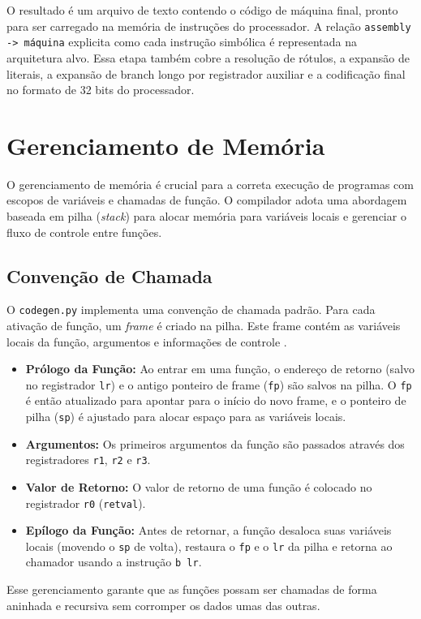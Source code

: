 \documentclass[
	12pt,				%
	oneside,
	a4paper,			%
	english,			%
	french,				%
	spanish,			%
	brazil,				%
	]{abntex2}
\begin{document}
O resultado é um arquivo de texto contendo o código de máquina final, pronto para ser carregado na memória de instruções do processador. A relação \texttt{assembly -> máquina} explicita como cada instrução simbólica é representada na arquitetura alvo. Essa etapa também cobre a resolução de rótulos, a expansão de literais, a expansão de branch longo por registrador auxiliar e a codificação final no formato de 32 bits do processador.

\section{Gerenciamento de Memória}

O gerenciamento de memória é crucial para a correta execução de programas com escopos de variáveis e chamadas de função. O compilador adota uma abordagem baseada em pilha (\emph{stack}) para alocar memória para variáveis locais e gerenciar o fluxo de controle entre funções.

\subsection{Convenção de Chamada}
O \texttt{codegen.py} implementa uma convenção de chamada padrão. Para cada ativação de função, um \emph{frame} é criado na pilha. Este frame contém as variáveis locais da função, argumentos e informações de controle \cite{compOrgDes,patterson2017}.
\begin{itemize}
    \item \textbf{Prólogo da Função:} Ao entrar em uma função, o endereço de retorno (salvo no registrador \texttt{lr}) e o antigo ponteiro de frame (\texttt{fp}) são salvos na pilha. O \texttt{fp} é então atualizado para apontar para o início do novo frame, e o ponteiro de pilha (\texttt{sp}) é ajustado para alocar espaço para as variáveis locais.
    \item \textbf{Argumentos:} Os primeiros argumentos da função são passados através dos registradores \texttt{r1}, \texttt{r2} e \texttt{r3}.
    \item \textbf{Valor de Retorno:} O valor de retorno de uma função é colocado no registrador \texttt{r0} (\texttt{retval}).
    \item \textbf{Epílogo da Função:} Antes de retornar, a função desaloca suas variáveis locais (movendo o \texttt{sp} de volta), restaura o \texttt{fp} e o \texttt{lr} da pilha e retorna ao chamador usando a instrução \texttt{b lr}.
\end{itemize}
Esse gerenciamento garante que as funções possam ser chamadas de forma aninhada e recursiva sem corromper os dados umas das outras.
\end{document}
